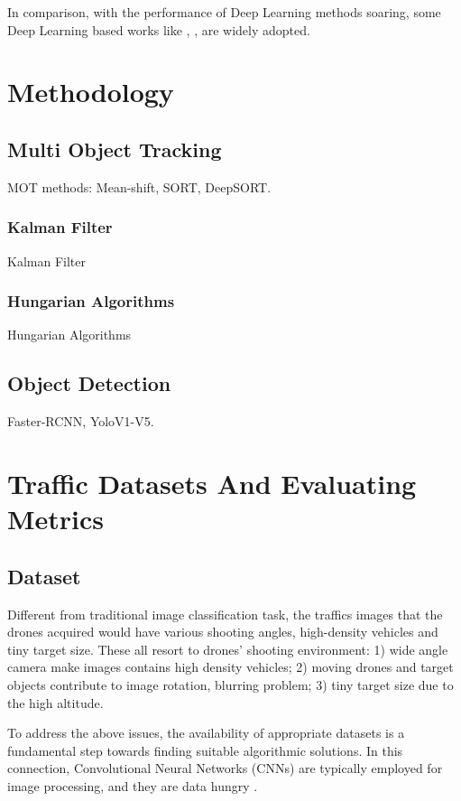 \documentclass[10pt,twocolumn,letterpaper]{article}  %
\begin{document}
In comparison, with the performance of Deep Learning methods soaring, some Deep Learning based works like \cite{li2019simultaneously}, \cite{zhu2018urban}, \cite{micheal2019automatic} are widely adopted.




\section{Methodology}
\subsection{Multi Object Tracking}
MOT methods: Mean-shift, SORT, DeepSORT.
\subsubsection{Kalman Filter}
Kalman Filter
\subsubsection{Hungarian Algorithms}
Hungarian Algorithms

\subsection{Object Detection}
Faster-RCNN, YoloV1-V5.


\section{Traffic Datasets And Evaluating Metrics}
\subsection{Dataset}
Different from traditional image classification task, the traffics images that the drones acquired would have various shooting angles, high-density vehicles and tiny target size. These all resort to drones' shooting environment: 1)  wide angle camera make images contains high density vehicles; 2) moving drones and target objects contribute to image rotation, blurring problem; 3) tiny target size due to the high altitude.

To address the above issues, the availability of appropriate
datasets is a fundamental step towards finding suitable algorithmic solutions. In this connection, Convolutional Neural Networks (CNNs) are typically employed for image processing, and they are data hungry \cite{waqas2019isaid}.
\end{document}
